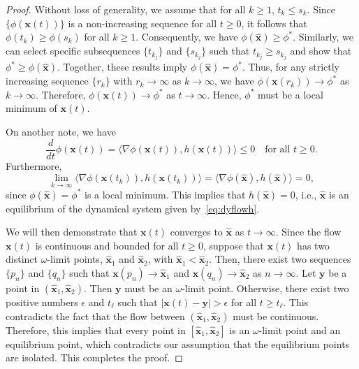 \documentclass[onefignum,onetabnum]{siamart220329}
\begin{document}
{\begin{proof}
    Without loss of generality, we assume that for all $k \geq 1$, $t_k \leq s_k$. Since $\{\phi(\mathbf{x}(t))\}$ is a non-increasing sequence for all $t \geq 0$, it follows that $\phi(t_k) \geq \phi(s_k)$ for all $k \geq 1$. Consequently, we have $\phi(\hat{\mathbf{x}}) \geq \phi^*$. Similarly, we can select specific subsequences $\{t_{k_j}\}$ and $\{s_{k_j}\}$ such that $t_{k_j} \geq s_{k_j}$ and show that $\phi^* \geq \phi(\hat{\mathbf{x}})$. Together, these results imply $\phi(\hat{\mathbf{x}}) = \phi^*$. Thus, for any strictly increasing sequence $\{r_k\}$ with $r_k \to \infty$ as $k \to \infty$, we have $\phi(\mathbf{x}(r_k)) \to \phi^*$ as $k \to \infty$. Therefore, $\phi(\mathbf{x}(t)) \to \phi^*$ as $t \to \infty$. Hence, $\phi^*$ must be a local minimum of $\mathbf{x}(t)$.
    
    On another note, we have 
    \[
    \frac{d}{dt} \phi(\mathbf{x}(t)) = \langle \nabla \phi(\mathbf{x}(t)), h(\mathbf{x}(t)) \rangle \leq 0 \quad \text{for all } t \geq 0.
    \]
    Furthermore, 
    \begin{equation*}
    \lim_{k \to \infty} \langle \nabla \phi(\mathbf{x}(t_k)), h(\mathbf{x}(t_k)) \rangle = \langle \nabla \phi(\hat{\mathbf{x}}), h(\hat{\mathbf{x}}) \rangle = 0,
    \end{equation*}
    since $\phi(\hat{\mathbf{x}}) = \phi^*$ is a local minimum. This implies that $h(\hat{\mathbf{x}}) = 0$, i.e., $\hat{\mathbf{x}}$ is an equilibrium of the dynamical system given by~\eqref{eq:dyflowh}.
    
    We will then demonstrate that $\mathbf{x}(t)$ converges to $\hat{\mathbf{x}}$ as $t \to \infty$. Since the flow $\mathbf{x}(t)$ is continuous and bounded for all $t \geq 0$, suppose that $\mathbf{x}(t)$ has two distinct $\omega$-limit points, $\hat{\mathbf{x}}_1$ and $\hat{\mathbf{x}}_2$, with $\hat{\mathbf{x}}_1 < \hat{\mathbf{x}}_2$. Then, there exist two sequences $\{p_n\}$ and $\{q_n\}$ such that $\mathbf{x}(p_n) \to \hat{\mathbf{x}}_1$ and $\mathbf{x}(q_n) \to \hat{\mathbf{x}}_2$ as $n \to \infty$. Let $\mathbf{y}$ be a point in $(\hat{\mathbf{x}}_1, \hat{\mathbf{x}}_2)$. Then $\mathbf{y}$ must be an $\omega$-limit point. Otherwise, there exist two positive numbers $\epsilon$ and $t_\ell$ such that $|\mathbf{x}(t) - \mathbf{y}| > \epsilon$ for all $t \geq t_\ell$. This contradicts the fact that the flow between $(\hat{\mathbf{x}}_1, \hat{\mathbf{x}}_2)$ must be continuous. Therefore, this implies that every point in $[\hat{\mathbf{x}}_1, \hat{\mathbf{x}}_2]$ is an $\omega$-limit point and an equilibrium point, which contradicts our assumption that the equilibrium points are isolated. This completes the proof.
    \end{proof}
    
}
\end{document}
